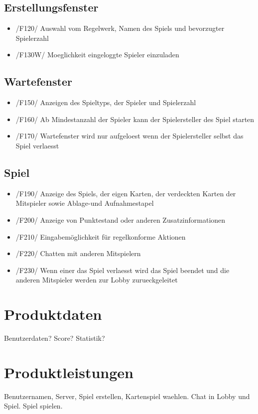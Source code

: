 \documentclass{article}
\begin{document}
\subsection{Erstellungsfenster}
\begin{itemize}
	\item /F120/ Auswahl vom Regelwerk, Namen des Spiels und bevorzugter Spielerzahl
	\item /F130W/ Moeglichkeit eingeloggte Spieler einzuladen
\end{itemize}

\subsection{Wartefenster}
\begin{itemize}
	\item /F150/ Anzeigen des Spieltyps, der Spieler und Spielerzahl
	\item /F160/ Ab Mindestanzahl der Spieler kann der Spielersteller des Spiel starten
	\item /F170/ Wartefenster wird nur aufgeloest wenn der Spielersteller selbst das Spiel verlaesst
\end{itemize}

\subsection{Spiel}
\begin{itemize}
	\item /F190/ Anzeige des Spiels, der eigen Karten, der verdeckten Karten der Mitspieler sowie Ablage-und Aufnahmestapel
	\item /F200/ Anzeige von Punktestand oder anderen Zusatzinformationen
	\item /F210/ Eingabemöglichkeit für regelkonforme Aktionen
	\item /F220/ Chatten mit anderen Mitspielern
	\item /F230/ Wenn einer das Spiel verlaesst wird das Spiel beendet und die anderen Mitspieler werden zur Lobby zurueckgeleitet
\end{itemize}

\section{Produktdaten}
Benutzerdaten?
Score?
Statistik?

\section{Produktleistungen}
Benutzernamen, Server, Spiel erstellen, Kartenspiel waehlen. Chat in Lobby und Spiel. Spiel spielen.
\end{document}
